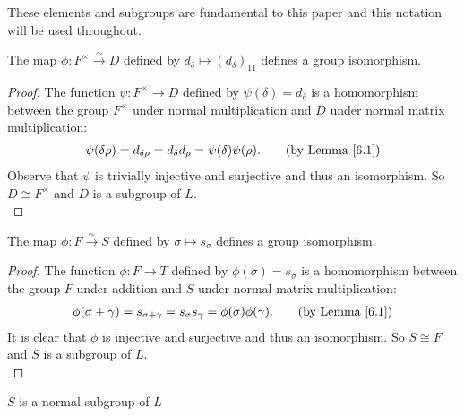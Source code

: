 These elements and subgroups are fundamental to this paper and this notation will be used throughout.

\begin{lemma}
\label{SpecialSubgroups.D_iso_units}
\leanok
The map $\phi : F^\times \overset{\sim}{\rightarrow} D$ defined by $d_\delta \mapsto (d_\delta)_{11}$ defines a group isomorphism.
\end{lemma}

\begin{proof}
    The function $\psi: F^\times \rightarrow D$ defined by $\psi(\delta) = d_\delta$ is a homomorphism between the group $F^\times$ under normal multiplication and $D$ under normal matrix multiplication:
\begin{align*} \psi(\delta \rho) = d_{\delta \rho} =  d_\delta d_\rho = \psi(\delta) \psi(\rho). \tag{by Lemma \ref{6.1}}
\end{align*}
Observe that $\psi$ is trivially injective and surjective and thus an isomorphism. So $D\cong F^\times$ and $D$ is a subgroup of $L$.\\
\end{proof}



\begin{lemma}
\label{SpecialSubgroups.S_iso_F, SpecialMatrices.s_mul_s_eq_s_add}
\leanok
    The map $\phi : F \overset{\sim}{\rightarrow} S$ defined by $\sigma \mapsto s_\sigma$ defines a group isomorphism.
\end{lemma}

\begin{proof}
     The function $\phi: F \rightarrow T$ defined by $\phi(\sigma) = s_\sigma$ is a homomorphism between the group $F$ under addition and $S$ under normal matrix multiplication:
\begin{align*} \phi(\sigma + \gamma) = s_{\sigma + \gamma} = s_\sigma s_\gamma = \phi(\sigma) \phi(\gamma). \tag{by Lemma \ref{6.1}}
\end{align*}
It is clear that $\phi$ is injective and surjective and thus an isomorphism. So $ S \cong F$ and $S$ is a subgroup of $L$. \\
\end{proof}



\begin{lemma}
\label{SpecialSubgroups.normal_S_subgroupOf_L}
\leanok
$S$ is a normal subgroup of $L$
\end{lemma}

